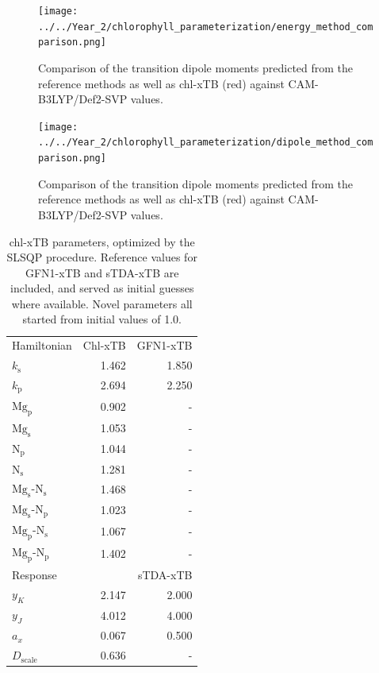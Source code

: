 \begin{figure}
    \centering
    \texttt{[image: ../../Year\_2/chlorophyll\_parameterization/energy\_method\_comparison.png]}
    \caption{Comparison of the \Qy transition dipole moments predicted from the
    reference methods as well as chl-xTB (red) against CAM-B3LYP/Def2-SVP values.}
    \label{fig:energy_camb3lyp_scatter}
\end{figure}

\begin{figure}
    \centering
    \texttt{[image: ../../Year\_2/chlorophyll\_parameterization/dipole\_method\_comparison.png]}
    \caption{Comparison of the \Qy transition dipole moments predicted from the
    reference methods as well as chl-xTB (red) against CAM-B3LYP/Def2-SVP values.}
    \label{fig:dipole_camb3lyp_scatter}
\end{figure}

\begin{table}
    \centering
    \begin{tabular}{|| l r | r ||}
    \hline
    Hamiltonian & Chl-xTB & GFN1-xTB \\
    $k_\text{s}$ & 1.462 & 1.850 \\
    $k_\text{p}$ & 2.694 & 2.250 \\

    $\text{Mg}_\text{p}$ & 0.902 & - \\
    $\text{Mg}_\text{s}$ & 1.053 & - \\
    $\text{N}_\text{p}$ & 1.044 & - \\
    $\text{N}_\text{s}$ & 1.281 & - \\

    $\text{Mg}_\text{s}$-$\text{N}_\text{s}$ & 1.468 & - \\
    $\text{Mg}_\text{s}$-$\text{N}_\text{p}$ & 1.023 & - \\
    $\text{Mg}_\text{p}$-$\text{N}_\text{s}$ & 1.067 & - \\
    $\text{Mg}_\text{p}$-$\text{N}_\text{p}$ & 1.402 & - \\

    \hline\hline
    Response & & sTDA-xTB\\
    $y_K$ & 2.147 & 2.000 \\
    $y_J$ & 4.012 & 4.000 \\
    $a_x$ & 0.067 & 0.500 \\
    $D_{\text{scale}}$ & 0.636 & - \\
    \hline
    \end{tabular}
    \caption{chl-xTB parameters, optimized by the SLSQP procedure. Reference values
    for GFN1-xTB and sTDA-xTB are included, and served as initial guesses where 
    available. Novel parameters all started from initial values of 1.0.}
    \label{table:chl_params}
\end{table}

